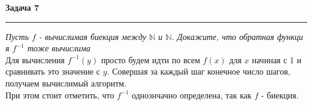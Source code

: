 \documentclass[a4paper,11pt]{article}
\begin{document}
\textbf{\large Задача 7}
\medskip\hrule\medskip
\textit{Пусть $ f $ - вычислимая биекция между $ \mathbb{{N}} $ и $ \mathbb{N} $. Докажите, что обратная функци я $ f^{-1} $ тоже вычислима} \\ 

Для вычисления $ f^{-1}(y) $ просто будем идти по всем $ f(x) $ для $ x $ начиная с 1 и сравнивать это значение с $ y $. Совершая за каждый шаг конечное число шагов, получаем вычислимый алгоритм.  \\
При этом стоит отметить, что $ f^{-1} $ однознчачно определена, так как $ f $ -  биекция.
\end{document}

